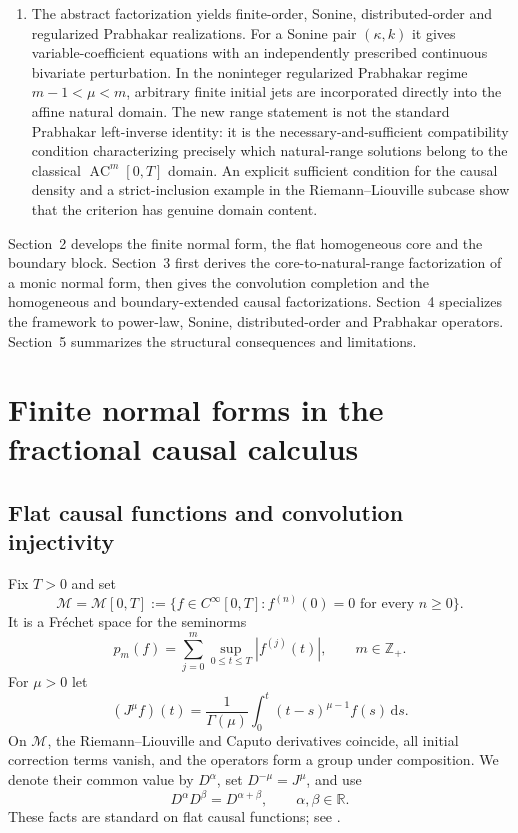 \documentclass[11pt]{article}
\numberwithin{equation}{section}
\theoremstyle{definition}
\theoremstyle{remark}
\newcommand{\R}{\mathbb R}
\newcommand{\Z}{\mathbb Z}
\newcommand{\M}{\mathcal M}
\newcommand{\dd}{\,\mathrm d}
\newcommand{\AC}{\operatorname{AC}}
\begin{document}
\begin{enumerate}[leftmargin=*,label=\arabic*.]
\item The abstract factorization yields finite-order, Sonine, distributed-order and regularized Prabhakar realizations. For a Sonine pair $(\kappa,k)$ it gives variable-coefficient equations with an independently prescribed continuous bivariate perturbation. In the noninteger regularized Prabhakar regime $m-1<\mu<m$, arbitrary finite initial jets are incorporated directly into the affine natural domain. The new range statement is not the standard Prabhakar left-inverse identity: it is the necessary-and-sufficient compatibility condition characterizing precisely which natural-range solutions belong to the classical $\AC^m[0,T]$ domain. An explicit sufficient condition for the causal density and a strict-inclusion example in the Riemann--Liouville subcase show that the criterion has genuine domain content.
\end{enumerate}

Section~2 develops the finite normal form, the flat homogeneous core and the boundary block. Section~3 first derives the core-to-natural-range factorization of a monic normal form, then gives the convolution completion and the homogeneous and boundary-extended causal factorizations. Section~4 specializes the framework to power-law, Sonine, distributed-order and Prabhakar operators. Section~5 summarizes the structural consequences and limitations.

\section{Finite normal forms in the fractional causal calculus}

\subsection{Flat causal functions and convolution injectivity}

Fix $T>0$ and set
\begin{equation*}
\M=\M[0,T]:=\{f\in C^\infty[0,T]:f^{(n)}(0)=0\text{ for every }n\ge0\}.
\end{equation*}
It is a Fr\'echet space for the seminorms
\begin{equation*}
p_m(f)=\sum_{j=0}^{m}\sup_{0\le t\le T}|f^{(j)}(t)|,
\qquad m\in\Z_+.
\end{equation*}
For $\mu>0$ let
\begin{equation*}
(J^\mu f)(t)=\frac1{\Gamma(\mu)}\int_0^t(t-s)^{\mu-1}f(s)\dd s.
\end{equation*}
On $\M$, the Riemann--Liouville and Caputo derivatives coincide, all initial correction terms vanish, and the operators form a group under composition. We denote their common value by $D^\alpha$, set $D^{-\mu}=J^\mu$, and use
\begin{equation}
D^\alpha D^\beta=D^{\alpha+\beta},
\qquad \alpha,\beta\in\R.
\label{eq:group-law}
\end{equation}
These facts are standard on flat causal functions; see \cite{Kilbas2006,Podlubny1999,Samko1993}.
\end{document}
